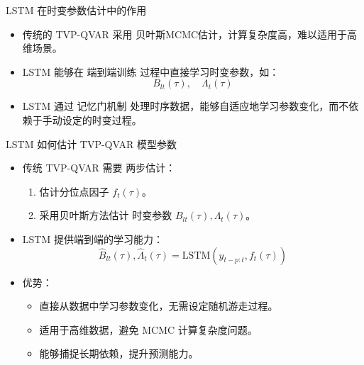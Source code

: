 \documentclass{beamer}
\begin{document}
\begin{frame}{LSTM 在时变参数估计中的作用}
  \begin{itemize}
      \item 传统的 TVP-QVAR 采用 贝叶斯MCMC估计，计算复杂度高，难以适用于高维场景。
      \item LSTM 能够在 端到端训练 过程中直接学习时变参数，如：
      \[
      B_{lt}(\tau), \quad \Lambda_t(\tau)
      \]
      \item LSTM 通过 记忆门机制 处理时序数据，能够自适应地学习参数变化，而不依赖于手动设定的时变过程。
  \end{itemize}
\end{frame}



\begin{frame}{LSTM 如何估计 TVP-QVAR 模型参数}
  \begin{itemize}
      \item 传统 TVP-QVAR 需要 两步估计：
      \begin{enumerate}
          \item 估计分位点因子 \( f_t(\tau) \)。
          \item 采用贝叶斯方法估计 时变参数 \( B_{lt}(\tau), \Lambda_t(\tau) \)。
      \end{enumerate}
      \item LSTM 提供端到端的学习能力：
      \begin{equation}
          \hat{B}_{lt}(\tau), \hat{\Lambda}_t(\tau) = \text{LSTM}(y_{t-p:t}, f_t(\tau))
      \end{equation}
      \item 优势：
      \begin{itemize}
          \item 直接从数据中学习参数变化，无需设定随机游走过程。
          \item 适用于高维数据，避免 MCMC 计算复杂度问题。
          \item 能够捕捉长期依赖，提升预测能力。
      \end{itemize}
  \end{itemize}
\end{frame}
\end{document}
